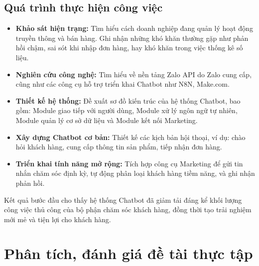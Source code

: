 \subsection*{Quá trình thực hiện công việc}

\begin{itemize}
    \item \textbf{Khảo sát hiện trạng:} Tìm hiểu cách doanh nghiệp đang quản lý
    hoạt động truyền thông và bán hàng. Ghi nhận những khó khăn thường gặp
    như phản hồi chậm, sai sót khi nhập đơn hàng, hay khó khăn trong việc thống
    kê số liệu.

    \item \textbf{Nghiên cứu công nghệ:} Tìm hiểu về nền tảng Zalo API do Zalo cung cấp, cũng như các công cụ hỗ trợ triển khai
    Chatbot như N8N, Make.com.

    \item \textbf{Thiết kế hệ thống:} Đề xuất sơ đồ kiến trúc của hệ thống Chatbot,
    bao gồm: Module giao tiếp với người dùng, Module xử lý ngôn ngữ tự nhiên,
    Module quản lý cơ sở dữ liệu và Module kết nối Marketing.

    \item \textbf{Xây dựng Chatbot cơ bản:} Thiết kế các kịch bản hội thoại, ví dụ:
    chào hỏi khách hàng, cung cấp thông tin sản phẩm, tiếp nhận đơn hàng.

    \item \textbf{Triển khai tính năng mở rộng:} Tích hợp công cụ Marketing để gửi
    tin nhắn chăm sóc định kỳ, tự động phân loại khách hàng tiềm năng, và ghi
    nhận phản hồi.

\end{itemize}

Kết quả bước đầu cho thấy hệ thống Chatbot đã giảm tải đáng kể khối lượng công
việc thủ công của bộ phận chăm sóc khách hàng, đồng thời tạo trải nghiệm mới mẻ và
tiện lợi cho khách hàng.


\section{Phân tích, đánh giá đề tài thực tập}

